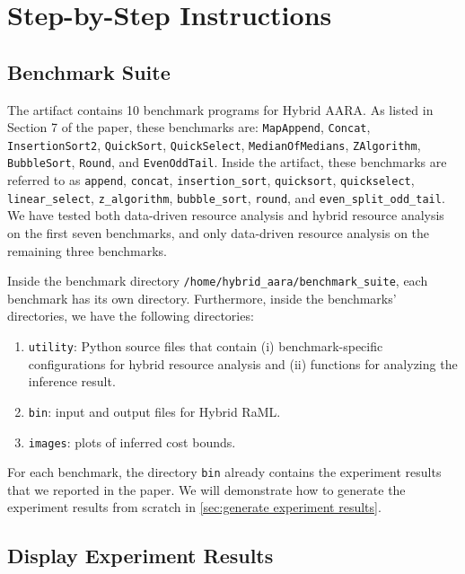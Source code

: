 
\section{Step-by-Step Instructions}

\subsection{Benchmark Suite}

The artifact contains 10 benchmark programs for Hybrid AARA.
%
As listed in Section 7 of the paper, these benchmarks are: \texttt{MapAppend},
\texttt{Concat}, \texttt{InsertionSort2}, \texttt{QuickSort},
\texttt{QuickSelect}, \texttt{MedianOfMedians}, \texttt{ZAlgorithm},
\texttt{BubbleSort}, \texttt{Round}, and \texttt{EvenOddTail}.
%
Inside the artifact, these benchmarks are referred to as \texttt{append},
\texttt{concat}, \texttt{insertion\_sort}, \texttt{quicksort},
\texttt{quickselect}, \texttt{linear\_select}, \texttt{z\_algorithm},
\texttt{bubble\_sort}, \texttt{round}, and \texttt{even\_split\_odd\_tail}.
%
We have tested both data-driven resource analysis and hybrid resource analysis
on the first seven benchmarks, and only data-driven resource analysis on the
remaining three benchmarks.

Inside the benchmark directory \texttt{/home/hybrid\_aara/benchmark\_suite},
each benchmark has its own directory.
%
Furthermore, inside the benchmarks' directories, we have the following
directories:
\begin{enumerate}
  \item \texttt{utility}: Python source files that contain (i)
        benchmark-specific configurations for hybrid resource analysis and (ii)
        functions for analyzing the inference result.
  \item \texttt{bin}: input and output files for Hybrid RaML.
  \item \texttt{images}: plots of inferred cost bounds.
\end{enumerate}

For each benchmark, the directory \texttt{bin} already contains the experiment
results that we reported in the paper.
%
We will demonstrate how to generate the experiment results from scratch in
\cref{sec:generate experiment results}.

\subsection{Display Experiment Results}

